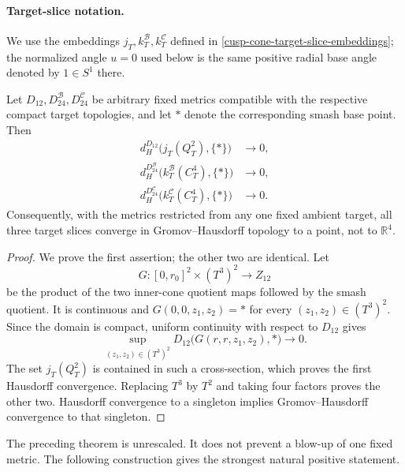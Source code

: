 \paragraph{Target-slice notation.}
We use the embeddings
\(j_T,k_T^{\mathcal B},k_T^{\mathcal C}\) defined in
\cref{cusp-cone-target-slice-embeddings}; the normalized angle \(u=0\) used
below is the same positive radial base angle denoted by \(1\in S^1\) there.

\begin{theorem}
\label{sphere-metric-uniform-collapse}
Let \(D_{12},D_{24}^{\mathcal B},D_{24}^{\mathcal C}\) be arbitrary fixed
metrics compatible with the respective compact target topologies, and let
\(*\) denote the corresponding smash base point.  Then
\begin{align}
 d_H^{D_{12}}\bigl(j_T(Q_T^2),\{*\}\bigr)&\longrightarrow0,\\
 d_H^{D_{24}^{\mathcal B}}
  \bigl(k_T^{\mathcal B}(C_T^4),\{*\}\bigr)&\longrightarrow0,\\
 d_H^{D_{24}^{\mathcal C}}
  \bigl(k_T^{\mathcal C}(C_T^4),\{*\}\bigr)&\longrightarrow0.
 \label{sphere-metric-Hausdorff-collapse}
\end{align}
Consequently, with the metrics restricted from any one fixed ambient
target, all three target slices converge in Gromov--Hausdorff topology to
a point, not to \(\mathbb R^4\).
\end{theorem}

\begin{proof}
We prove the first assertion; the other two are identical.  Let
\[
 G:[0,r_0]^2\times(T^3)^2\longrightarrow Z_{12}
\]
be the product of the two inner-cone quotient maps followed by the smash
quotient.  It is continuous and
\(G(0,0,z_1,z_2)=*\) for every \((z_1,z_2)\in(T^3)^2\).  Since the domain
is compact, uniform continuity with respect to \(D_{12}\) gives
\[
 \sup_{(z_1,z_2)\in(T^3)^2}
 D_{12}\bigl(G(r,r,z_1,z_2),*\bigr)\longrightarrow0.
\]
The set \(j_T(Q_T^2)\) is contained in such a cross-section, which proves
the first Hausdorff convergence.  Replacing \(T^3\) by \(T^2\) and taking
four factors proves the other two.  Hausdorff convergence to a singleton
implies Gromov--Hausdorff convergence to that singleton.
\end{proof}

The preceding theorem is unrescaled.  It does not prevent a blow-up of one
fixed metric.  The following construction gives the strongest natural
positive statement.

